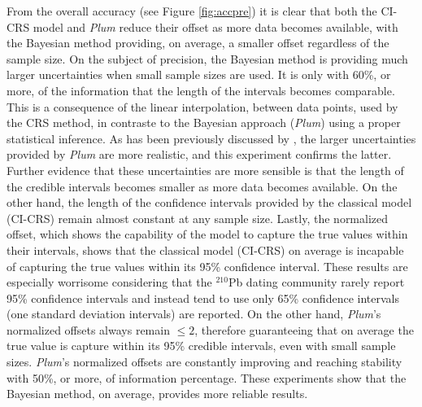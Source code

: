 \documentclass [10pt] {article}
\begin{document}
From the overall accuracy (see Figure \ref{fig:accpre}) it is clear that both the CI-CRS model and \textit{Plum} reduce their offset as more data becomes available, with the Bayesian method providing, on average, a smaller offset regardless of the sample size. 
On the subject of precision, the Bayesian method is providing much larger uncertainties when small sample sizes are used. 
It is only with 60\%, or more, of the information that the length of the intervals becomes comparable. 
This is a consequence of the linear interpolation, between data points, used by the CRS method, in contraste to the Bayesian approach (\textit{Plum}) using a proper statistical inference.  
As has been previously discussed by \citet{Aquino2020}, the larger uncertainties provided by \textit{Plum} are more realistic, and this experiment confirms the latter.
Further evidence that these uncertainties are more sensible is that the length of the credible intervals becomes smaller as more data becomes available. 
On the other hand, the length of the confidence intervals provided by the classical model (CI-CRS) remain almost constant at any sample size.
Lastly, the normalized offset, which shows the capability of the model to capture the true values within their intervals, shows that the classical model (CI-CRS) on average is incapable of capturing the true values within its 95\% confidence interval. 
These results are especially worrisome considering that the $^{210}$Pb dating community rarely report 95\% confidence intervals and instead tend to use only 65\% confidence intervals (one standard deviation intervals) are reported.
On the other hand, \textit{Plum}'s normalized offsets always remain $\leq 2$, therefore guaranteeing that on average the true value is capture within its 95\% credible intervals, even with small sample sizes.
\textit{Plum}'s normalized offsets are constantly improving and reaching stability with 50\%, or more, of information percentage.
These experiments show that the Bayesian method, on average, provides more reliable results.
\end{document}
